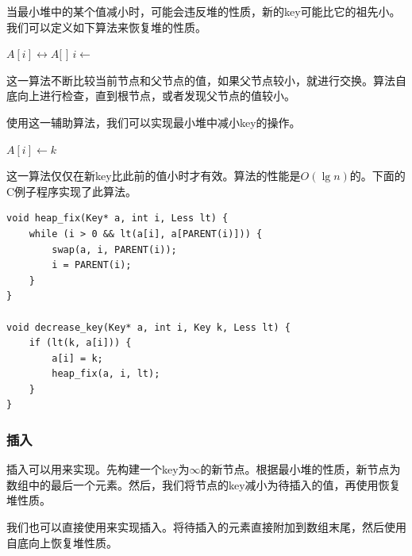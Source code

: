 \documentclass[b5paper]{ctexart}
\begin{document}
当最小堆中的某个值减小时，可能会违反堆的性质，新的key可能比它的祖先小。我们可以定义如下算法来恢复堆的性质。

\begin{algorithmic}[1]
    \State {} $A[i] \leftrightarrow A[$  $]$
    \State $i \gets$  
  \EndWhile
\EndFunction
\end{algorithmic}

这一算法不断比较当前节点和父节点的值，如果父节点较小，就进行交换。算法自底向上进行检查，直到根节点，或者发现父节点的值较小。

使用这一辅助算法，我们可以实现最小堆中减小key的操作。

\begin{algorithmic}[1]
    \State $A[i] \gets k$
    \State {}
  \EndIf
\EndFunction
\end{algorithmic}

这一算法仅仅在新key比此前的值小时才有效。算法的性能是$O(\lg n)$的。下面的C例子程序实现了此算法。

\lstset{language=C}
\begin{lstlisting}
void heap_fix(Key* a, int i, Less lt) {
    while (i > 0 && lt(a[i], a[PARENT(i)])) {
        swap(a, i, PARENT(i));
        i = PARENT(i);
    }
}

void decrease_key(Key* a, int i, Key k, Less lt) {
    if (lt(k, a[i])) {
        a[i] = k;
        heap_fix(a, i, lt);
    }
}
\end{lstlisting}

\subsubsection{插入}

插入可以用来实现\cite{CLRS}。先构建一个key为$\infty$的新节点。根据最小堆的性质，新节点为数组中的最后一个元素。然后，我们将节点的key减小为待插入的值，再使用恢复堆性质。

我们也可以直接使用来实现插入。将待插入的元素直接附加到数组末尾，然后使用自底向上恢复堆性质。

\begin{algorithmic}[1]
  \State {}
  \State {}
\EndFunction
\end{algorithmic}
\end{document}
